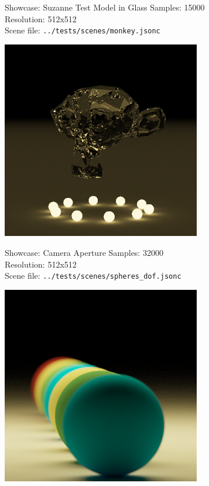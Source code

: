 \documentclass{beamer}
\begin{document}
\begin{frame}{Showcase: Suzanne Test Model in Glass}
    \footnotesize{
    Samples: 15000\\
    Resolution: 512x512\\
    Scene file: \texttt{../tests/scenes/monkey.jsonc}
    }
    \begin{center}
        \includegraphics[width=0.65\textwidth]{../img/suzanne_glass.png}
    \end{center}
\end{frame}

\begin{frame}{Showcase: Camera Aperture}
    \footnotesize{
    Samples: 32000\\
    Resolution: 512x512\\
    Scene file: \texttt{../tests/scenes/spheres\_dof.jsonc}
    }
    \begin{center}
        \includegraphics[width=0.65\textwidth]{../img/dof.png}
    \end{center}
\end{frame}
\end{document}
